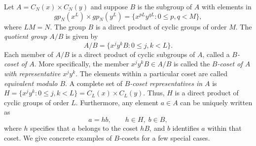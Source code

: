 Let $A=C_N(x) \times C_N(y)$ and suppose $B$ is the subgroup
of $A$ with elements in
\[
 gp_N(x^L) \times gp_N(y^L) = 
\{x^{pL} y^{qL} : 0 \leq p,q < M \},
\]
where $LM = N$.  The group $B$ is a direct product of cyclic groups of order
$M$. The \emph{quotient group} $A/B$ is given by
\[
A/B = \{x^j y^k B : 0 \leq j,k < L \}.
\]
Each member of $A/B$ is a direct product of cyclic subgroups
of $A$, called a \emph{$B$-coset of $A$}.  More specifically, the
member $x^j y^k B \in A/B$ is called the 
\emph{$B$-coset of $A$ with representative
$x^j y^k$}.  The elements within a particular coset are 
called \emph{equivalent modulo $B$}.
A complete set of \emph{$B$-coset representatives in $A$}  is 
$H = \{x^j y^k : 0 \leq j,k < L \} = C_L(x) \times C_L(y)$.
Thus, $H$ is a direct product of cyclic groups of order $L$.
Furthermore, any element $a\in A$ can be uniquely written as
\[
a = hb, \qquad h\in H,\; b\in B,
\]
where $h$ specifies that $a$ belongs to the coset $hB$, and $b$ identifies $a$
within that coset. 
We give concrete examples of $B$-cosets for a few special cases.  
